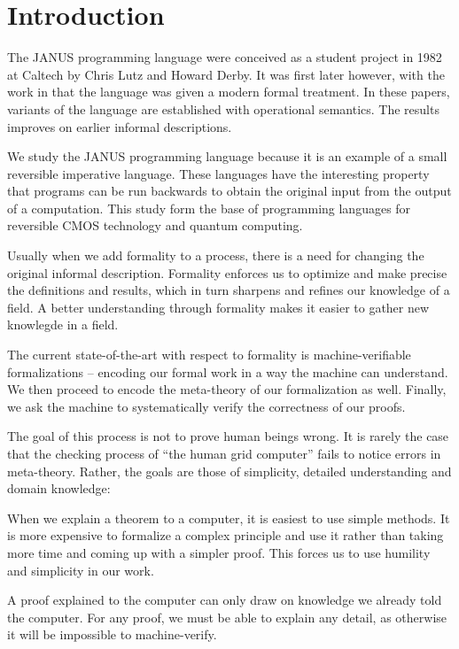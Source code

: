 \chapter{Introduction}

The JANUS programming language were conceived as a student project in
1982 at Caltech by Chris Lutz and Howard Derby. It was first later
however, with the work in \cite{glueck+2007, glueck+2008} that
the language was given a modern formal treatment. In these papers, variants
of the language are established with operational semantics. The
results improves on earlier informal descriptions.

We study the JANUS programming language because it is an example of a
small reversible imperative language. These languages have the
interesting property that programs can be run backwards to obtain the
original input from the output of a computation. This study form the
base of programming languages for reversible CMOS technology and
quantum computing.

Usually when we add formality to a process, there is a need for
changing the original informal description. Formality enforces us to
optimize and make precise the definitions and results, which in turn
sharpens and refines our knowledge of a field. A better understanding
through formality makes it easier to gather new knowlegde in a field.

The current state-of-the-art with respect to formality is
machine-verifiable formalizations -- encoding our formal work in a way
the machine can understand. We then proceed to encode the meta-theory
of our formalization as well. Finally, we ask the machine to
systematically verify the correctness of our proofs.

The goal of this process is not to prove human beings wrong. It is
rarely the case that the checking process of ``the human grid
computer'' fails to notice errors in meta-theory. Rather, the goals
are those of simplicity, detailed understanding and domain knowledge:

When we explain a theorem to a computer, it is easiest to use simple
methods. It is more expensive to formalize a complex principle and use
it rather than taking more time and coming up with a simpler
proof. This forces us to use humility and simplicity in our work.

A proof explained to the computer can only draw on knowledge we
already told the computer. For any proof, we must be able to
explain any detail, as otherwise it will be impossible to
machine-verify.

